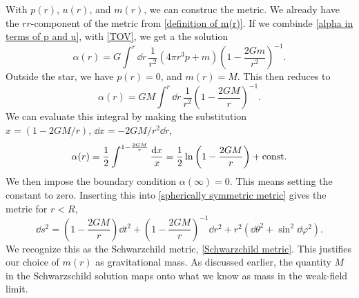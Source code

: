 With $p(r)$, $u(r)$, and $m(r)$, we can construc the metric.
We already have the $rr$-component of the metric from \autoref{definition of m(r)}.
If we combinde \autoref{alpha in terms of p and u}, with \autoref{TOV}, we get a the solution
%
\begin{equation}
    \label{solution to alpha}
    \alpha(r) = G \int^r \dd r \, \frac{1}{r^2} (4 \pi r^3 p + m)
    \left(1 - \frac{2 G m}{r^2} \right)^{-1}.
\end{equation}
%
Outside the star, we have $p(r) = 0$, and $m(r) = M$.
This then reduces to
%
\begin{equation}
    \alpha(r) = G M \int^r \dd r \, \frac{1}{r^2} \left(1 - \frac{2 G M}{r}\right)^{-1}.
\end{equation}
%
We can evaluate this integral by making the substitution $x = (1 - 2GM/r), \, \dd x = - 2GM/r^2 \dd r$,
%
\begin{equation}
    \alpha(r) = \frac{1}{2} \int^{1-\frac{2GM}{r}} \frac{\dd x}{x}
    = \frac{1}{2} \ln \left(1 - \frac{2GM}{r}\right) + \mathrm{const.}
\end{equation}
%
We then impose the boundary condition $\alpha(\infty) = 0$.
This means setting the constant to zero.
Inserting this into \autoref{spherically symmetric metric} gives the metric for $r<R$,
%
\begin{equation}
    \dd s^2
    =
    \left(1 - \frac{2GM}{r}\right) \dd t^2
    + \left(1 - \frac{2 G M}{r}\right)^{-1} \dd r^2
    + r^2 \left(\dd \theta^2 + \sin^2\dd\varphi^2\right).
\end{equation}
%
We recognize this as the Schwarzchild metric, \autoref{Schwarzchild metric}.
This justifies our choice of $m(r)$ as gravitational mass.
As discussed earlier, the quantity $M$ in the Schwarzschild solution maps onto what we know as mass in the weak-field limit.



